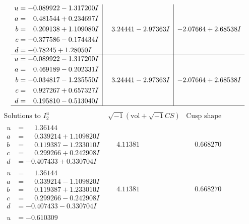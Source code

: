 \documentclass[1p]{elsarticle_modified}
\theoremstyle{definition}
\newcommand{\I}{\sqrt{-1}}
\begin{document}
$$\begin{array}{c|c|c}
\begin{aligned}
u &= -0.089922 - 1.317200 I \\
a &= \phantom{-}0.481544 + 0.234697 I \\
b &= \phantom{-}0.209138 + 1.109080 I \\
c &= -0.377586 - 0.174434 I \\
d &= -0.78245 + 1.28050 I\end{aligned}
 & \phantom{-}3.24441 - 2.97363 I & -2.07664 + 2.68538 I \\ \hline\begin{aligned}
u &= -0.089922 - 1.317200 I \\
a &= \phantom{-}0.469189 - 0.202331 I \\
b &= -0.034817 - 1.235550 I \\
c &= \phantom{-}0.927267 + 0.657327 I \\
d &= \phantom{-}0.195810 - 0.513040 I\end{aligned}
 & \phantom{-}3.24441 - 2.97363 I & -2.07664 + 2.68538 I\\
 \hline 
 \end{array}$$\newpage$$\begin{array}{c|c|c}  
\text{Solutions to }I^u_{2}& \I (\text{vol} + \sqrt{-1}CS) & \text{Cusp shape}\\
 \hline 
\begin{aligned}
u &= \phantom{-}1.36144\phantom{ +0.000000I} \\
a &= \phantom{-}0.339214 + 1.109820 I \\
b &= \phantom{-}0.119387 - 1.233010 I \\
c &= \phantom{-}0.299266 + 0.242908 I \\
d &= -0.407433 + 0.330704 I\end{aligned}
 & \phantom{-}4.11381\phantom{ +0.000000I} & \phantom{-}0.668270\phantom{ +0.000000I} \\ \hline\begin{aligned}
u &= \phantom{-}1.36144\phantom{ +0.000000I} \\
a &= \phantom{-}0.339214 - 1.109820 I \\
b &= \phantom{-}0.119387 + 1.233010 I \\
c &= \phantom{-}0.299266 - 0.242908 I \\
d &= -0.407433 - 0.330704 I\end{aligned}
 & \phantom{-}4.11381\phantom{ +0.000000I} & \phantom{-}0.668270\phantom{ +0.000000I} \\ \hline\begin{aligned}
u &= -0.610309\phantom{ +0.000000I} \\

\end{aligned}
\end{array}$$
\end{document}
